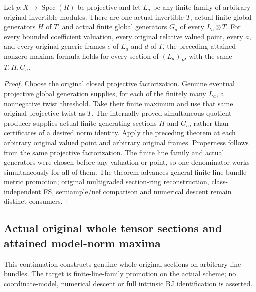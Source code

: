 \begin{theorem}
\label{thm:seven-general-finite-line-norm-quotient}
\leanok
{}
Let $p:X\to\operatorname{Spec}(R)$ be projective and let $L_a$ be any
finite family of arbitrary original invertible modules. There are one
actual invertible $T$, actual finite global generators $H$ of $T$, and
actual finite global generators $G_a$ of every $L_a\otimes T$.
For every bounded coefficient valuation, every original relative valued
point, every $a$, and every original generic frames $e$ of $L_a$ and
$d$ of $T$, the preceding attained nonzero maxima formula holds for
every section of $(L_a)_F$, with the same $T,H,G_a$.
\end{theorem}
\begin{proof}
Choose the original closed projective factorization. Genuine eventual
projective global generation supplies, for each of the finitely many
$L_a$, a nonnegative twist threshold. Take their finite maximum and use
that same original projective twist as $T$. The internally proved
simultaneous quotient producer supplies actual finite generating sections
$H$ and $G_a$, rather than certificates of a desired norm identity.
Apply the preceding theorem at each arbitrary original valued point and
arbitrary original frames. Properness follows from the same projective
factorization. The finite line family and actual generators were chosen
before any valuation or point, so one denominator works simultaneously
for all of them. The theorem advances general finite line-bundle metric
promotion; original multigraded section-ring reconstruction,
class-independent FS, semiample/nef comparison and numerical descent
remain distinct consumers.
\end{proof}

\subsection{Actual original whole tensor sections and attained model-norm maxima}
This continuation constructs genuine whole original sections on arbitrary
line bundles. The target is finite-line-family promotion on the actual
scheme; no coordinate-model, numerical descent or full intrinsic BJ
identification is asserted.

